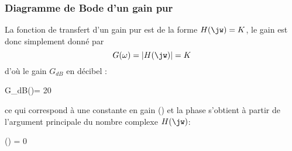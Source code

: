 \newpage

\subsubsection{Diagramme de Bode d'un gain pur}

La fonction de transfert d'un gain pur est de la forme $H(\jw)=K$,
le gain est donc simplement donné par 
$$
G(\omega)=|H(\jw)|=K
$$ 
d'où le gain $G_{dB}$ en décibel :
\begin{bequation}
G_{dB}(\omega)= 20
\end{bequation} ce qui correspond à une constante en gain 
() et la phase s'obtient à partir de l'argument 
principale du nombre complexe $H(\jw)$:
\begin{bequation}
\phi(\omega) = 0
\end{bequation}

